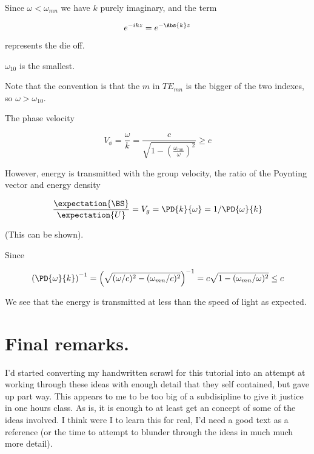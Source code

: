 Since $\omega < \omega_{mn}$ we have $k$ purely imaginary, and the term

\begin{equation}\label{eqn:relativisticElectrodynamicsT4:520}
e^{-i k z} = e^{- \Abs{k} z}
\end{equation}

represents the die off.

$\omega_{10}$ is the smallest.

Note that the convention is that the $m$ in $TE_{mn}$ is the bigger of the two indexes, so $\omega > \omega_{10}$.

The phase velocity 

\begin{equation}\label{eqn:relativisticElectrodynamicsT4:530}
V_\phi = \frac{\omega}{k} = \frac{c}{\sqrt{ 1 - \left(\frac{\omega_{mn}}{\omega}\right)^2 }} \ge c
\end{equation}

However, energy is transmitted with the group velocity, the ratio of the Poynting vector and energy density

\begin{equation}\label{eqn:relativisticElectrodynamicsT4:540}
\frac{\expectation{\BS}}{\expectation{U}} = V_g = \PD{k}{\omega} = 1/\PD{\omega}{k}
\end{equation}

(This can be shown).

Since

\begin{equation}\label{eqn:relativisticElectrodynamicsT4:560}
\left(\PD{\omega}{k}\right)^{-1} = 
\left(
\sqrt{ (\omega/c)^2 - (\omega_{mn}/c)^2 }
\right)^{-1} = c \sqrt{ 1 - (\omega_{mn}/\omega)^2 } \le c
\end{equation}

We see that the energy is transmitted at less than the speed of light as expected.

\section{Final remarks.}

I'd started converting my handwritten scrawl for this tutorial into an attempt at working through these ideas with enough detail that they self contained, but gave up part way.  This appears to me to be too big of a subdisipline to give it justice in one hours class.  As is, it is enough to at least get an concept of some of the ideas involved.  I think were I to learn this for real, I'd need a good text as a reference (or the time to attempt to blunder through the ideas in much much more detail).

\EndNoBibArticle
